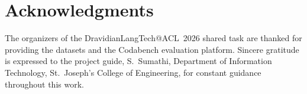 \documentclass[11pt]{article}
\begin{document}
\section*{Acknowledgments}
The organizers of the DravidianLangTech@ACL~2026 shared task are thanked for
providing the datasets and the Codabench evaluation platform. Sincere gratitude is
expressed to the project guide, S.~Sumathi, Department of Information Technology,
St.~Joseph's College of Engineering, for constant guidance throughout this work.


\end{document}
